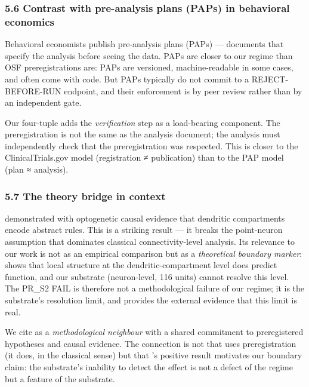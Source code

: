 \documentclass[
]{article}
\begin{document}
\subsubsection{5.6 Contrast with pre-analysis plans (PAPs) in behavioral
economics}\label{contrast-with-pre-analysis-plans-paps-in-behavioral-economics}

Behavioral economists publish pre-analysis plans (PAPs) --- documents
that specify the analysis before seeing the data. PAPs are closer to our
regime than OSF preregistrations are: PAPs are versioned,
machine-readable in some cases, and often come with code. But PAPs
typically do not commit to a REJECT-BEFORE-RUN endpoint, and their
enforcement is by peer review rather than by an independent gate.

Our four-tuple adds the \emph{verification} step as a load-bearing
component. The preregistration is not the same as the analysis document;
the analysis must independently check that the preregistration was
respected. This is closer to the ClinicalTrials.gov model (registration
≠ publication) than to the PAP model (plan ≈ analysis).

\subsubsection{5.7 The \citet{ref35} theory bridge in
context}\label{the-xu-2026-theory-bridge-in-context}

\citet{ref35} demonstrated with optogenetic causal evidence that
dendritic compartments encode abstract rules. This is a striking result
--- it breaks the point-neuron assumption that dominates classical
connectivity-level analysis. Its relevance to our work is not as an
empirical comparison but as a \emph{theoretical boundary marker}: \citet{ref35} shows that local structure at the dendritic-compartment level does
predict function, and our substrate (neuron-level, 116 units) cannot
resolve this level. The PR\_S2 FAIL is therefore not a methodological
failure of our regime; it is the substrate's resolution limit, and \citet{ref35} provides the external evidence that this limit is real.

We cite \citet{ref35} as a \emph{methodological neighbour} with a shared
commitment to preregistered hypotheses and causal evidence. The
connection is not that \citet{ref35} uses preregistration (it does, in the
classical sense) but that \citet{ref35}'s positive result motivates our
boundary claim: the substrate's inability to detect the effect is not a
defect of the regime but a feature of the substrate.
\end{document}
